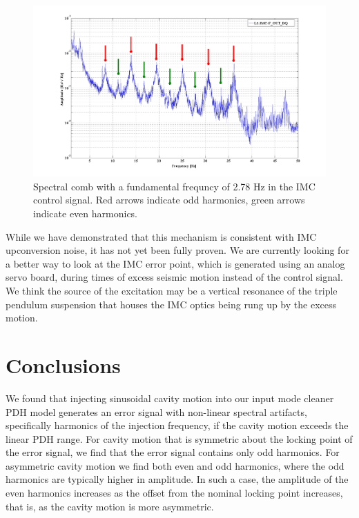\begin{figure}[h!]
\includegraphics[height=0.6\textwidth]{figures/IMCUpconversion/upconversion_comb.png}
\caption[Spectral comb in IMC control signal]{Spectral comb with a fundamental frequncy of 2.78 Hz in the IMC control signal. Red arrows indicate odd harmonics, green arrows indicate even harmonics. }
\label{fig:imc-harmonics}
\end{figure}

While we have demonstrated that this mechanism is consistent with IMC upconversion noise, 
it has not yet been fully proven. We are currently looking for a better way to look at 
the IMC error point, which is generated using an analog servo board, during times of 
excess seismic motion instead of the control signal. 
We think the source of the excitation may be a vertical resonance of the triple 
pendulum suspension that houses the IMC optics being rung up by the excess motion.

\section{Conclusions}

We found that injecting sinusoidal cavity motion into our input mode cleaner PDH model 
generates an error signal with non-linear spectral artifacts, specifically harmonics 
of the injection frequency, if the cavity motion exceeds the linear PDH range. 
For cavity motion that is symmetric about the locking point of the error signal, 
we find that the error signal contains only odd harmonics. For asymmetric cavity 
motion we find both even and odd harmonics, where the odd harmonics are typically higher 
in amplitude. In such a case, the amplitude of the even harmonics increases as the 
offset from the nominal locking point increases, that is, as the cavity motion is 
more asymmetric.

